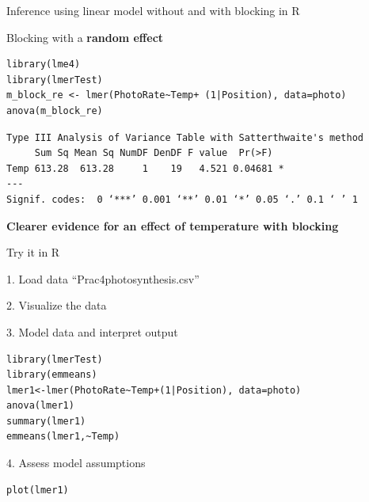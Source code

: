\documentclass[10pt]{beamer}
\makeatletter
\newenvironment{kframe}{%
 \def\at@end@of@kframe{}%
 \ifinner\ifhmode%
  \def\at@end@of@kframe{\end{minipage}}%
  \begin{minipage}{\columnwidth}%
 \fi\fi%
 \def\FrameCommand##1{\hskip\@totalleftmargin \hskip-\fboxsep
 \colorbox{shadecolor}{##1}\hskip-\fboxsep
     \hskip-\linewidth \hskip-\@totalleftmargin \hskip\columnwidth}%
 \MakeFramed {\advance\hsize-\width
   \@totalleftmargin\z@ \linewidth\hsize
   \@setminipage}}%
 {\par\unskip\endMakeFramed%
 \at@end@of@kframe}
\newenvironment{knitrout}{}{} %
\makeatother
\begin{document}
\begin{frame}[fragile]{Inference using linear model without and with blocking in R}
 
 Blocking with a \textbf{random effect}
  \begin{knitrout}
\color{fgcolor}\begin{kframe}
\begin{verbatim}
library(lme4)
library(lmerTest)
m_block_re <- lmer(PhotoRate~Temp+ (1|Position), data=photo)
anova(m_block_re)
\end{verbatim}
\end{kframe}
\end{knitrout}

\begin{knitrout}
\color{fgcolor}\begin{kframe}
\begin{verbatim}
Type III Analysis of Variance Table with Satterthwaite's method
     Sum Sq Mean Sq NumDF DenDF F value  Pr(>F)  
Temp 613.28  613.28     1    19   4.521 0.04681 *
---
Signif. codes:  0 ‘***’ 0.001 ‘**’ 0.01 ‘*’ 0.05 ‘.’ 0.1 ‘ ’ 1
\end{verbatim}
\end{kframe}
\end{knitrout}
 
 \textbf{Clearer evidence for an effect of temperature with blocking}
 
\end{frame}

\begin{frame}[fragile]{Try it in R}

1. Load data ``Prac4photosynthesis.csv''

2. Visualize the data

3. Model data and interpret output
\begin{knitrout}
\color{fgcolor}\begin{kframe}
\begin{verbatim}
library(lmerTest)
library(emmeans)
lmer1<-lmer(PhotoRate~Temp+(1|Position), data=photo)
anova(lmer1)
summary(lmer1)
emmeans(lmer1,~Temp)
\end{verbatim}
\end{kframe}
\end{knitrout}

4. Assess model assumptions
\begin{knitrout}
\color{fgcolor}\begin{kframe}
\begin{verbatim}
plot(lmer1)
\end{verbatim}
\end{kframe}
\end{knitrout}


\end{frame}
\end{document}

